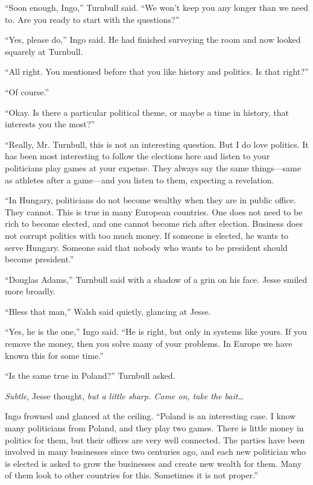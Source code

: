 \documentclass[12pt]{book}
\begin{document}
``Soon enough, Ingo,'' Turnbull said.  ``We won't keep you any longer than we need to.  Are you ready to start with the questions?''

``Yes, please do,'' Ingo said.  He had finished surveying the room and now looked squarely at Turnbull.

``All right.  You mentioned before that you like history and politics.  Is that right?''

``Of course.''

``Okay.  Is there a particular political theme, or maybe a time in history, that interests you the most?''

``Really, Mr. Turnbull, this is not an interesting question.  But I do love politics.  It has been most interesting to follow the elections here and listen to your politicians play games at your expense.  They always say the same things---same as athletes after a game---and you listen to them, expecting a revelation.

``In Hungary, politicians do not become wealthy when they are in public office.  They cannot.  This is true in many European countries.  One does not need to be rich to become elected, and one cannot become rich after election.  Business does not corrupt politics with too much money.  If someone is elected, he wants to serve Hungary.  Someone said that nobody who wants to be president should become president.''

``Douglas Adams,'' Turnbull said with a shadow of a grin on his face.  Jesse smiled more broadly.

``Bless that man,'' Walsh said quietly, glancing at Jesse.

``Yes, he is the one,'' Ingo said.  ``He is right, but only in systems like yours.  If you remove the money, then you solve many of your problems.  In Europe we have known this for some time.''

``Is the same true in Poland?'' Turnbull asked.

\emph{Subtle}, Jesse thought, \emph{but a little sharp.  Come on, take the bait\dots}

Ingo frowned and glanced at the ceiling.  ``Poland is an interesting case.  I know many politicians from Poland, and they play two games.  There is little money in politics for them, but their offices are very well connected.  The parties have been involved in many businesses since two centuries ago, and each new politician who is elected is asked to grow the businesses and create new wealth for them.  Many of them look to other countries for this.  Sometimes it is not proper.''
\end{document}
